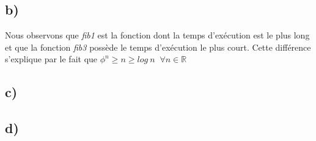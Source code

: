 \documentclass[12pt]{article}
\begin{document}
  	
    \subsection*{b)}
      \noindent Nous observons que \textit{fib1} est la fonction dont la temps d'exécution est le plus long et que la fonction \textit{fib3} possède le temps d'exécution le plus court. Cette différence s'explique par le fait que \( \phi^n \geq n \geq log \: n  \; \; \forall n \in \mathbb{R} \)
    \subsection*{c)}
    \subsection*{d)}
  \newpage
\end{document}
